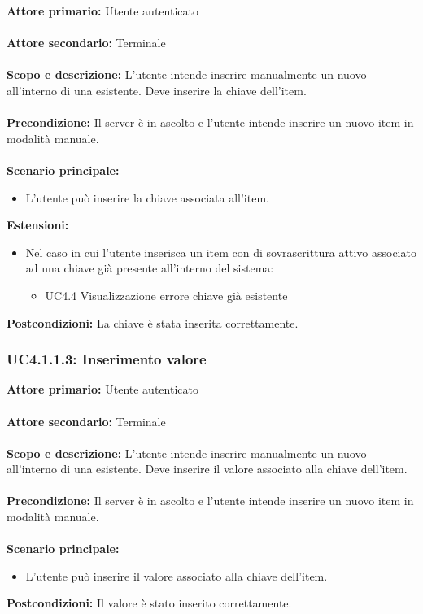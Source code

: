 \documentclass{scalatekids-article}
\begin{document}
\textbf{Attore primario:} Utente autenticato\\ \\
\textbf{Attore secondario:} Terminale\\ \\
\textbf{Scopo e descrizione:} L'utente intende inserire manualmente un nuovo  all'interno di una  esistente. Deve inserire la chiave dell'item.\\ \\
\textbf{Precondizione:} Il server è in ascolto e l'utente intende inserire un nuovo item in modalità manuale.\\ \\
\textbf{Scenario principale:}
\begin{itemize}
\item L'utente può inserire la chiave associata all'item.
\end{itemize}
\textbf{Estensioni:}
\begin{itemize}
\item Nel caso in cui l'utente inserisca un item con  di sovrascrittura attivo associato ad una chiave già presente all'interno del sistema:
  \begin{itemize}
  \item UC4.4 Visualizzazione errore chiave già esistente
  \end{itemize}
\end{itemize}
\textbf{Postcondizioni:} La chiave è stata inserita correttamente.

\subsubsection{UC4.1.1.3: Inserimento valore}

\textbf{Attore primario:} Utente autenticato\\ \\
\textbf{Attore secondario:} Terminale\\ \\
\textbf{Scopo e descrizione:} L'utente intende inserire manualmente un nuovo  all'interno di una  esistente. Deve inserire il valore associato alla chiave dell'item.\\ \\
\textbf{Precondizione:} Il server è in ascolto e l'utente intende inserire un nuovo item in modalità manuale.\\ \\
\textbf{Scenario principale:}
\begin{itemize}
\item L'utente può inserire il valore associato alla chiave dell'item.
\end{itemize}
\textbf{Postcondizioni:} Il valore è stato inserito correttamente.
\end{document}
